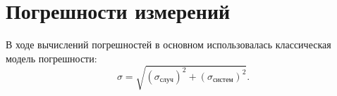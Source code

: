 \documentclass[a4paper,12pt]{extarticle}
\begin{document}










\section{Погрешности измерений}
В ходе вычислений погрешностей в основном использовалась классическая модель погрешности:
$$ \sigma = \sqrt{(\sigma_\text{случ})^2 + (\sigma_\text{систем})^2}.$$
\end{document}
